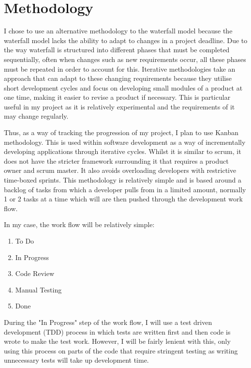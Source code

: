 \documentclass[]{report}
\begin{document}
	\section{Methodology}
		I chose to use an alternative methodology to the waterfall model because the waterfall model lacks the ability to adapt to changes in a project deadline. Due to the way waterfall is structured into different phases that must be completed sequentially, often when changes such as new requirements occur, all these phases must be repeated in order to account for this. Iterative methodologies take an approach that can adapt to these changing requirements because they utilise short development cycles and focus on developing small modules of a product at one time, making it easier to revise a product if necessary. This is particular useful in my project as it is relatively experimental and the requirements of it may change regularly. 
		
		Thus, as a way of tracking the progression of my project, I plan to use Kanban methodology. This is used within software development as a way of incrementally developing applications through iterative cycles. Whilst it is similar to scrum, it does not have the stricter framework surrounding it that requires a product owner and scrum master. It also avoids overloading developers with restrictive time-boxed sprints. This methodology is relatively simple and is based around a backlog of tasks from which a developer pulls from in a limited amount, normally 1 or 2 tasks at a time which will are then pushed through the development work flow.
		
		In my case, the work flow will be relatively simple:
		\begin{enumerate}
			\item To Do
			\item In Progress
			\item Code Review
			\item Manual Testing
			\item Done
		\end{enumerate}
		During the "In Progress" step of the work flow, I will use a test driven development (TDD) process in which tests are written first and then code is wrote to make the test work. However, I will be fairly lenient with this, only using this process on parts of the code that require stringent testing as writing unnecessary tests will take up development time. 
		
\end{document}
